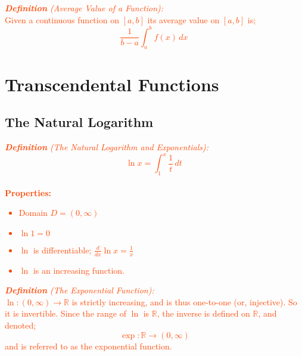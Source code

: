 \documentclass{report}
\newenvironment{definition}[1][OrangeRed]
  {\begin{tcolorbox}[colframe=#1,colback=white]}
  {\end{tcolorbox}}
\begin{document}
\begin{definition}
    \textcolor{OrangeRed}{\textit{\textbf{Definition} (Average Value of a Function):}\\
    Given a continuous function on $[a,b]$ its average value on $[a,b]$ is;
    \begin{equation}
        \frac{1}{b-a} \int_a^b f(x) \,dx\
    \end{equation}}
\end{definition}

\chapter{Transcendental Functions}
\section{The Natural Logarithm}

\begin{definition}
    \textcolor{OrangeRed}{\textit{\textbf{Definition} (The Natural Logarithm and Exponentials):}\\
    \begin{equation}
        \ln{x} = \int_1^x \frac{1}{t} \,dt\
    \end{equation}
    \\
    \textbf{Properties:}
    \begin{itemize}
        \item Domain $D = (0, \infty)$
        \item $\ln{1} = 0$
        \item $\ln$ is differentiable; $\frac{d}{dx} \ln{x} = \frac{1}{x}$
        \item $\ln$ is an increasing function.
    \end{itemize}}
\end{definition}

\begin{definition}
    \textcolor{OrangeRed}{\textit{\textbf{Definition} (The Exponential Function):}\\
    $\ln : (0, \infty) \longrightarrow \mathbb{R}$ is strictly increasing, and is thus one-to-one (or, injective). So it is invertible. Since the range of $\ln$ is $\mathbb{R}$, the inverse is defined on $\mathbb{R}$, and denoted;
    \begin{equation}
        \exp : \mathbb{R} \longrightarrow (0, \infty)
    \end{equation}
    and is referred to as the exponential function.}
\end{definition}
\end{document}
